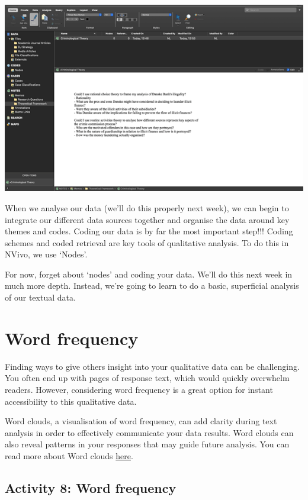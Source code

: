 \documentclass[
]{book}
\begin{document}
\includegraphics{imgs/theories_nvivo.png}

When we analyse our data (we'll do this properly next week), we can begin to integrate our different data sources together and organise the data around key themes and codes. Coding our data is by far the most important step!!! Coding schemes and coded retrieval are key tools of qualitative analysis. To do this in NVivo, we use `Nodes'.

For now, forget about `nodes' and coding your data. We'll do this next week in much more depth. Instead, we're going to learn to do a basic, superficial analysis of our textual data.

\hypertarget{word-frequency}{%
\section{Word frequency}\label{word-frequency}}

Finding ways to give others insight into your qualitative data can be challenging. You often end up with pages of response text, which would quickly overwhelm readers. However, considering word frequency is a great option for instant accessibility to this qualitative data.

Word clouds, a visualisation of word frequency, can add clarity during text analysis in order to effectively communicate your data results. Word clouds can also reveal patterns in your responses that may guide future analysis. You can read more about Word clouds \href{https://boostlabs.com/blog/what-are-word-clouds-value-simple-visualizations/}{here}.

\hypertarget{activity-8-word-frequency}{%
\subsection{Activity 8: Word frequency}\label{activity-8-word-frequency}}
\end{document}
